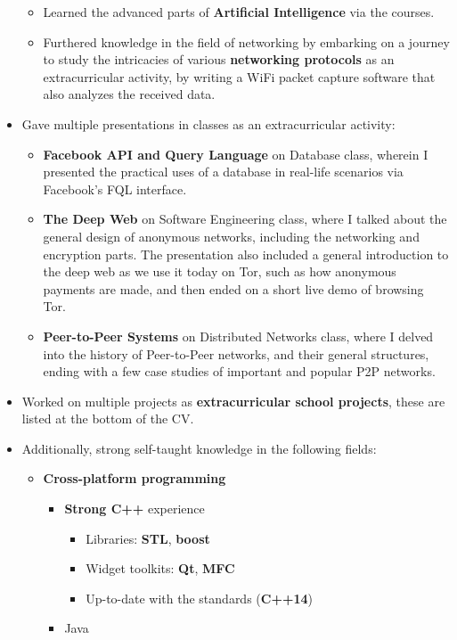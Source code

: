 \documentclass[12pt,a4paper]{article}
\begin{document}
\begin{itemize}
\begin{itemize}
		\item	Learned the advanced parts of \textbf{Artificial Intelligence} via the courses.
		\item	Furthered knowledge in the field of networking by embarking on a journey to study the intricacies of various \textbf{networking protocols} as an extracurricular activity, by writing a WiFi packet capture software that also analyzes the received data.
		\end{itemize}
	\item	Gave multiple presentations in classes as an extracurricular activity:
		\begin{itemize}
		\item	\textbf{Facebook API and Query Language} on Database class, wherein I presented the practical uses of a database in real-life scenarios via Facebook's FQL interface.
		\item	\textbf{The Deep Web} on Software Engineering class, where I talked about the general design of anonymous networks, including the networking and encryption parts. The presentation also included a general introduction to the deep web as we use it today on Tor, such as how anonymous payments are made, and then ended on a short live demo of browsing Tor.
		\item	\textbf{Peer-to-Peer Systems} on Distributed Networks class, where I delved into the history of Peer-to-Peer networks, and their general structures, ending with a few case studies of important and popular P2P networks.
		\end{itemize}
	\item	Worked on multiple projects as \textbf{extracurricular school projects}, these are listed at the bottom of the CV.
	\item	Additionally, strong self-taught knowledge in the following fields:
		\begin{itemize}
		\item	\textbf{Cross-platform programming}
			\begin{itemize}
			\item	\textbf{Strong C++} experience
				\begin{itemize}
				\item	Libraries: \textbf{STL}, \textbf{boost}
				\item	Widget toolkits: \textbf{Qt}, \textbf{MFC}
				\item	Up-to-date with the standards (\textbf{C++14})
				\end{itemize}
			\item	Java

\end{itemize}
\end{itemize}
\end{itemize}
\end{document}
